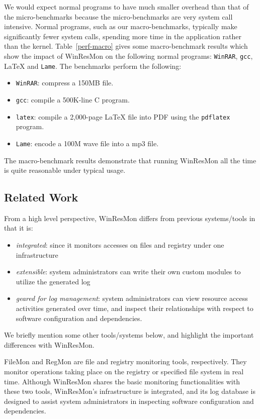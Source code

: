 We would expect normal programs to have much smaller overhead than that of the
micro-benchmarks because the micro-benchmarks are very system call intensive.
Normal programs, such as our macro-benchmarks, typically make significantly
fewer system calls, spending more time in the application rather than the
kernel.
Table~\ref{perf-macro} gives some macro-benchmark results which show the
impact of WinResMon on the following normal programs: {\small\tt WinRAR}, {\small\tt gcc}, \LaTeX{} and {\small\tt Lame}.
The benchmarks perform the following:
\begin{itemize}
\item {\small\tt WinRAR}: compress a 150MB file.  
\item {\small\tt gcc}: compile a 500K-line C program.  
\item {\small\tt latex}: compile a 2,000-page \LaTeX{} file into PDF using the
{\small\tt pdflatex} program.
\item {\small\tt Lame}: encode a 100M wave file into a mp3 file. 
\end{itemize}
The macro-benchmark results demonstrate that running WinResMon all the 
time  is quite reasonable under typical usage.


\subsection{Related Work}

 From a high level perspective, WinResMon differs from previous systems/tools in
that it is:

\begin{itemize}
\item {\em integrated}: since it monitors accesses on files and registry
under one infrastructure
\item {\em extensible}: system administrators can write their own custom
modules to utilize the generated log
\item {\em geared for log management}: system administrators can view
resource access activities generated over time, and inspect their relationships
with respect to software configuration and dependencies.
\end{itemize}

We briefly mention some other tools/systems below, and highlight the important
differences with WinResMon.

FileMon \cite{filemon} and RegMon \cite{regmon} are file and registry
monitoring tools, respectively.  They monitor operations taking place on
the registry or specified file system in real time.  Although WinResMon shares
the basic monitoring functionalities with these two tools, WinResMon's
infrastructure is integrated, and its log database is designed to assist
system administrators in inspecting software configuration and dependencies.

